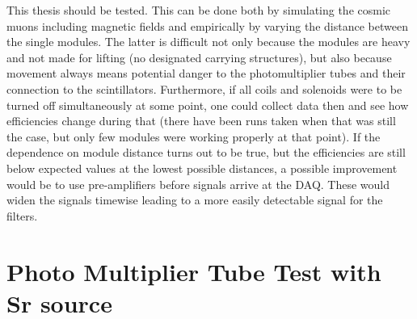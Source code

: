   This thesis should be tested. This can be done both by simulating the cosmic muons including magnetic fields and empirically by varying the distance between the single modules. The latter is difficult not only because the modules are heavy and not made for lifting (no designated carrying structures), but also because movement always means potential danger to the photomultiplier tubes and their connection to the scintillators.
  Furthermore, if all coils and solenoids were to be turned off simultaneously at some point, one could collect data then and see how efficiencies change during that (there have been runs taken when that was still the case, but only few modules were working properly at that point).
  If the dependence on module distance turns out to be true, but the efficiencies are still below expected values at the lowest possible distances, a possible improvement would be to use pre-amplifiers before signals arrive at the DAQ. These would widen the signals timewise leading to a more easily detectable signal for the filters.
  
  \section{Photo Multiplier Tube Test with Sr source}
  \label{ch:Analysis:sec:PhotoMultiplierTests}
  
